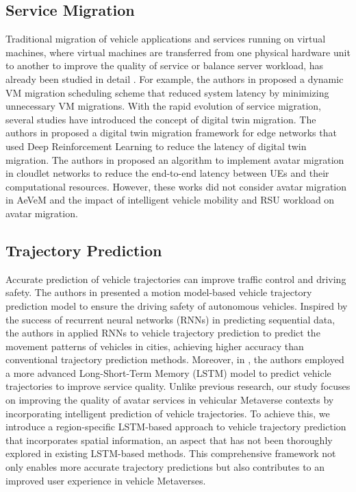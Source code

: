 \documentclass[lettersize,journal]{IEEEtran}
\begin{document}
\subsection{Service Migration}
Traditional migration of vehicle applications and services running on virtual machines, where virtual machines are transferred from one physical hardware unit to another to improve the quality of service or balance server workload, has already been studied in detail \cite{Osanaiye2017vm_migration}. For example, the authors in \cite{yu2018pre} proposed a dynamic VM migration scheduling scheme that reduced system latency by minimizing unnecessary VM migrations. With the rapid evolution of service migration, several studies have introduced the concept of digital twin migration. The authors in \cite{Lu2021dt_migration} proposed a digital twin migration framework for edge networks that used Deep Reinforcement Learning to reduce the latency of digital twin migration. The authors in \cite{sun2017adaptive} proposed an algorithm to implement avatar migration in cloudlet networks to reduce the end-to-end latency between UEs and their computational resources. However, these works did not consider avatar migration in AeVeM and the impact of intelligent vehicle mobility and RSU workload on avatar migration.

\subsection{Trajectory Prediction}
Accurate prediction of vehicle trajectories can improve traffic control and driving safety. The authors in \cite{Hou2013motion_model} presented a motion model-based vehicle trajectory prediction model to ensure the driving safety of autonomous vehicles. Inspired by the success of recurrent neural networks (RNNs) in predicting sequential data, the authors in \cite{zyner2019RNN} applied RNNs to vehicle trajectory prediction to predict the movement patterns of vehicles in cities, achieving higher accuracy than conventional trajectory prediction methods. Moreover, in \cite{guo2022v2v}, the authors employed a more advanced Long-Short-Term Memory (LSTM) model to predict vehicle trajectories to improve service quality. Unlike previous research, our study focuses on improving the quality of avatar services in vehicular Metaverse contexts by incorporating intelligent prediction of vehicle trajectories. To achieve this, we introduce a region-specific LSTM-based approach to vehicle trajectory prediction that incorporates spatial information, an aspect that has not been thoroughly explored in existing LSTM-based methods. This comprehensive framework not only enables more accurate trajectory predictions but also contributes to an improved user experience in vehicle Metaverses.
\end{document}
